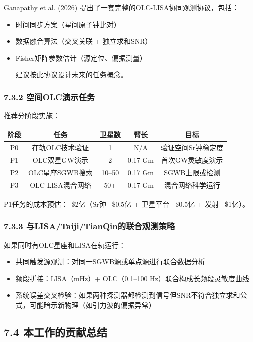 \documentclass[12pt,a4paper]{article}
\begin{document}
Ganapathy et al. (2026) 提出了一套完整的OLC-LISA协同观测协议，包括：
\begin{itemize}
  \item 时间同步方案（星间原子钟比对）
  \item 数据融合算法（交叉关联 + 独立求和SNR）
  \item Fisher矩阵参数估计（源定位、偏振测量）

建议按此协议设计未来的任务概念。

\end{itemize}
\subsubsection{7.3.2 空间OLC演示任务}


推荐分阶段实施：

\begin{tabular}{|c|c|c|c|c|}
\hline
阶段 & 任务 & 卫星数 & 臂长 & 目标 \\
\hline
P0 & 在轨OLC技术验证 & 1 & N/A & 验证空间Sr钟稳定度 \\
P1 & OLC双星GW演示 & 2 & 0.17 Gm & 首次GW灵敏度演示 \\
P2 & OLC星座SGWB搜索 & 10–50 & 0.17 Gm & SGWB上限或检测 \\
P3 & OLC-LISA混合网络 & 50+ & 0.17 Gm & 混合网络科学运行 \\
\hline
\end{tabular}


P1任务的成本预估：~\$2亿（Sr钟 ~\$0.5亿 + 卫星平台 ~\$0.5亿 + 发射 ~\$1亿）。

\subsubsection{7.3.3 与LISA/Taiji/TianQin的联合观测策略}


如果同时有OLC星座和LISA在轨运行：
\begin{itemize}
  \item 共同触发源观测：对同一SGWB源或单点源进行联合数据分析
  \item 频段拼接：LISA（mHz）+ OLC（0.1–100 Hz）联合构成长频段灵敏度曲线
  \item 系统误差交叉检验：如果两种探测器都检测到信号但SNR不符合独立求和公式，可能暗示新物理（如引力波的偏振异常）

\end{itemize}
\subsection{7.4 本工作的贡献总结}
\end{document}

